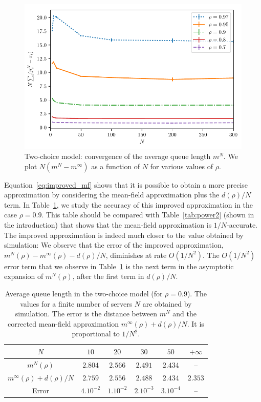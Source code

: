 \documentclass[acmlarge]{acmart}
\begin{document}
\begin{figure}[t]
  \centering
  \includegraphics[width=0.90\linewidth]{2choice_convergence_mean_noLog}
  \caption{Two-choice model: convergence of the average queue length
    $m^N$. We plot $N(m^N-m^{\infty})$ as a function of $N$ for
    various values of $\rho$.  }
  \label{fig:2-choice_mean}
\end{figure}


Equation~\eqref{eq:improved_mf} shows that it is possible to obtain a
more precise approximation by considering the mean-field approximation
plus the $d(\rho)/N$ term. In Table~\ref{tab:2}, we study the accuracy
of this improved approximation in the case $\rho=0.9$. This table
should be compared with Table~\ref{tab:power2} (shown in the
introduction) that shows that the mean-field approximation is
$1/N$-accurate. The improved approximation is indeed much closer to
the value obtained by simulation: We observe that the error of the
improved approximation, $m^N(\rho)-m^{\infty}(\rho)-d(\rho)/N$,
diminishes at rate $O(1/N^2)$.  The $O(1/N^2)$ error term that we
observe in Table~\ref{tab:2} is the next term in the asymptotic
expansion of $m^N(\rho)$, after the first term in $d(\rho)/N$.


\begin{table}[t]
  \centering
  \begin{tabular}{@{}|@{}c@{}|c|c|c|c|c|}
    \hline
    $N$
    &$  10$  &$  20$  &$  30$  &$  50$ & $+\infty$  \\\hline $m^N(\rho)$
    &$2.804$ &$2.566$ &$2.491$ &$2.434$&-- \\\hline $m^\infty(\rho){+}d(\rho)/N$ 
    &$2.759$ &$2.556$ &$2.488$ &$2.434$&$2.353$ \\\hline Error
    &$4. 10^{-2}$&$1 . 10^{-2}$&$2 .10^{-3}$&$3 . 10^{-4}$&--\\
    \hline
  \end{tabular}
  \caption{Average queue length in the two-choice model (for
    $\rho=0.9$). The values for a finite number of servers  $N$ are obtained by
    simulation. The error is the distance between $m^N$ and the
    corrected mean-field approximation $m^\infty(\rho)+d(\rho)/N$. It is
    proportional to $1/N^2$.}
  \label{tab:2}
\end{table}
\end{document}
